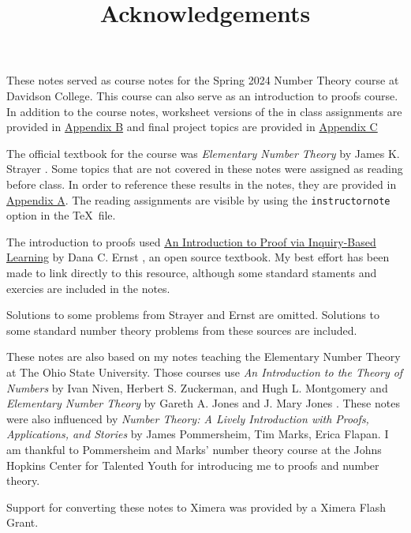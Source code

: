 \documentclass[letterpaper, 11 pt]{ximera}
\title{Acknowledgements}
\begin{document}
These notes served as course notes for the Spring 2024 Number Theory course at Davidson College. This course can also serve as an introduction to proofs course. In addition to the course notes, worksheet versions of the in class assignments are provided in \hyperref[inclass]{Appendix B} and final project topics are provided in \hyperref[finalProjects]{Appendix C}

The official textbook for the course was \emph{Elementary Number Theory} by James K. Strayer \cite{strayer}. Some topics that are not covered in these notes were assigned as reading before class. In order to reference these results in the notes, they are provided in \hyperref[other-results]{Appendix A}. The reading assignments are visible by using the \verb|instructornote| option in the \TeX\ file. 

The introduction to proofs used \href{https://danaernst.com/IBL-IntroToProof/pretext/root--1-2.html}{An Introduction to Proof via Inquiry-Based Learning} by Dana C. Ernst \cite{ernst}, an open source textbook. My best effort has been made to link directly to this resource, although some standard staments and exercies are included in the notes.

Solutions to some problems from Strayer and Ernst are omitted. Solutions to some standard number theory problems from these sources are included.

These notes are also based on my notes teaching the Elementary Number Theory at The Ohio State University. Those courses use \emph{An Introduction to the Theory of Numbers}
by Ivan Niven, Herbert S. Zuckerman, and Hugh L. Montgomery \cite{niven-zuckerman-montgomery} and \emph{Elementary Number Theory} by Gareth A. Jones and J. Mary Jones \cite{jones-jones}. These notes were also influenced by \emph{Number Theory: A Lively Introduction with Proofs, Applications, and Stories} by James Pommersheim, Tim Marks, Erica Flapan. I am thankful to Pommersheim and Marks' number theory course at the Johns Hopkins Center for Talented Youth for introducing me to proofs and number theory.

Support for converting these notes to Ximera was provided by a Ximera Flash Grant.
\end{document}
